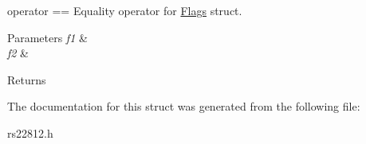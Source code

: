 operator == Equality operator for \hyperlink{structFlags}{Flags} struct. 


\begin{DoxyParams}{Parameters}
{\em f1} & \\
\hline
{\em f2} & \\
\hline
\end{DoxyParams}
\begin{DoxyReturn}{Returns}

\end{DoxyReturn}


The documentation for this struct was generated from the following file\-:\begin{DoxyCompactItemize}
\item 
rs22812.\-h\end{DoxyCompactItemize}
